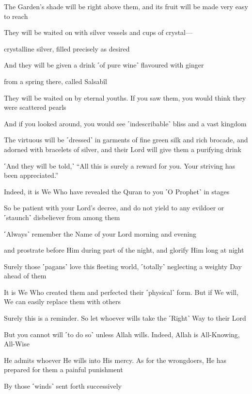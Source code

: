 The Garden’s shade will be right above them, and its fruit will be made very easy to reach

They will be waited on with silver vessels and cups of crystal—

crystalline silver, filled precisely as desired

And they will be given a drink ˹of pure wine˺ flavoured with ginger

from a spring there, called Salsabîl

They will be waited on by eternal youths. If you saw them, you would think they were scattered pearls

And if you looked around, you would see ˹indescribable˺ bliss and a vast kingdom

The virtuous will be ˹dressed˺ in garments of fine green silk and rich brocade, and adorned with bracelets of silver, and their Lord will give them a purifying drink

˹And they will be told,˺ “All this is surely a reward for you. Your striving has been appreciated.”

Indeed, it is We Who have revealed the Quran to you ˹O Prophet˺ in stages

So be patient with your Lord’s decree, and do not yield to any evildoer or ˹staunch˺ disbeliever from among them

˹Always˺ remember the Name of your Lord morning and evening

and prostrate before Him during part of the night, and glorify Him long at night

Surely those ˹pagans˺ love this fleeting world, ˹totally˺ neglecting a weighty Day ahead of them

It is We Who created them and perfected their ˹physical˺ form. But if We will, We can easily replace them with others

Surely this is a reminder. So let whoever wills take the ˹Right˺ Way to their Lord

But you cannot will ˹to do so˺ unless Allah wills. Indeed, Allah is All-Knowing, All-Wise

He admits whoever He wills into His mercy. As for the wrongdoers, He has prepared for them a painful punishment

By those ˹winds˺ sent forth successively

